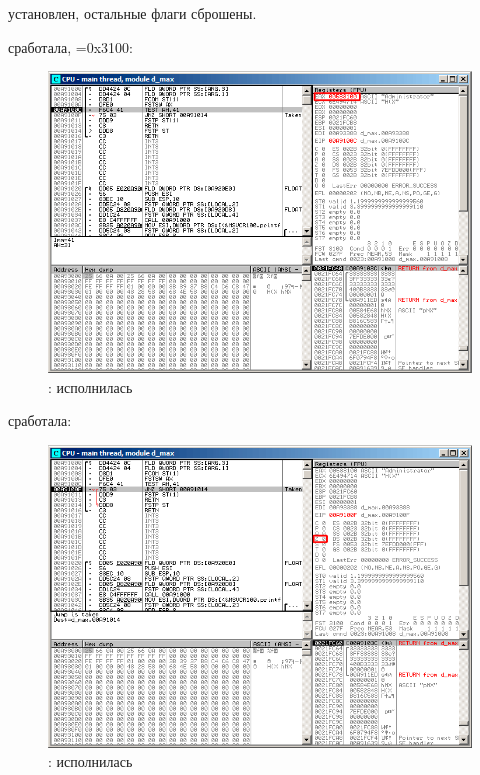 \Czero установлен, остальные флаги сброшены.

\clearpage
\FNSTSW сработала, =0x3100:

\begin{figure}[H]
\centering
\includegraphics[scale=\FigScale]{patterns/12_FPU/3_comparison/x86/MSVC_Ox/olly1_3.png}
\caption{\olly: \FNSTSW исполнилась}
\label{fig:FPU_comparison_Ox_case1_olly3}
\end{figure}

\clearpage
\TEST сработала:

\begin{figure}[H]
\centering
\includegraphics[scale=\FigScale]{patterns/12_FPU/3_comparison/x86/MSVC_Ox/olly1_4.png}
\caption{\olly: \TEST исполнилась}
\label{fig:FPU_comparison_Ox_case1_olly4}
\end{figure}

